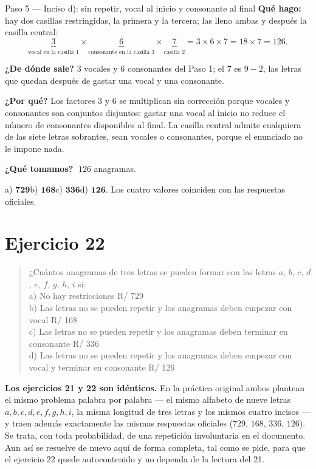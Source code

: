 \documentclass[11pt]{article}
\begin{document}
\begin{paso}{Paso 5 --- Inciso d): sin repetir, vocal al inicio y consonante al final}
\textbf{Qué hago:} hay dos casillas restringidas, la primera y la tercera; las lleno ambas y después la
casilla central:
\[
\underbrace{3}_{\text{vocal en la casilla 1}}\times\underbrace{6}_{\text{consonante en la casilla 3}}\times\underbrace{7}_{\text{casilla 2}}
=3\times6\times7=18\times7=126 .
\]

\textbf{¿De dónde sale?} $3$ vocales y $6$ consonantes del Paso 1; el $7$ es $9-2$, las letras que quedan
después de gastar una vocal y una consonante.

\textbf{¿Por qué?} Los factores $3$ y $6$ se multiplican sin corrección porque vocales y consonantes son
conjuntos disjuntos: gastar una vocal al inicio no reduce el número de consonantes disponibles al final.
La casilla central admite cualquiera de las siete letras sobrantes, sean vocales o consonantes, porque el
enunciado no le impone nada.

\textbf{¿Qué tomamos?} $\;126$ anagramas.
\end{paso}

\begin{resp}
a) $\mathbf{729}$\quad b) $\mathbf{168}$\quad c) $\mathbf{336}$\quad d) $\mathbf{126}$. Los cuatro valores
coinciden con las respuestas oficiales.
\end{resp}

\section*{Ejercicio 22}

\begin{quote}
¿Cuántos anagramas de tres letras se pueden formar con las letras $a$, $b$, $c$, $d$, $e$, $f$, $g$, $h$,
$i$ si:\\
a) No hay restricciones \hfill R/ 729\\
b) Las letras no se pueden repetir y los anagramas deben empezar con vocal \hfill R/ 168\\
c) Las letras no se pueden repetir y los anagramas deben terminar en consonante \hfill R/ 336\\
d) Las letras no se pueden repetir y los anagramas deben empezar con vocal y terminar en consonante
\hfill R/ 126
\end{quote}

\begin{nota}
\textbf{Los ejercicios 21 y 22 son idénticos.} En la práctica original ambos plantean el mismo problema
palabra por palabra --- el mismo alfabeto de nueve letras $a,b,c,d,e,f,g,h,i$, la misma longitud de tres
letras y los mismos cuatro incisos --- y traen además exactamente las mismas respuestas oficiales
($729$, $168$, $336$, $126$). Se trata, con toda probabilidad, de una repetición involuntaria en el
documento. Aun así se resuelve de nuevo aquí de forma completa, tal como se pide, para que el ejercicio 22
quede autocontenido y no dependa de la lectura del 21.
\end{nota}
\end{document}
